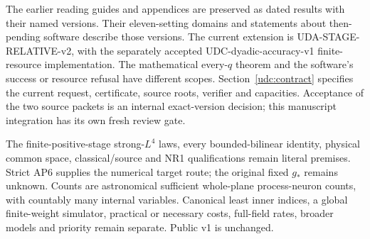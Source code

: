 The earlier reading guides and appendices are preserved as dated results
with their named versions. Their eleven-setting domains and statements
about then-pending software describe those versions. The current extension
is UDA-STAGE-RELATIVE-v2, with the separately accepted
UDC-dyadic-accuracy-v1 finite-resource implementation. The mathematical
every-$q$ theorem and the software's success or resource refusal have
different scopes. Section~\ref{udc:contract} specifies the current request,
certificate, source roots, verifier and capacities. Acceptance of the two
source packets is an internal exact-version decision; this manuscript
integration has its own fresh review gate.

The finite-positive-stage strong-$L^4$ laws, every bounded-bilinear identity,
physical common space, classical/source and NR1 qualifications remain
literal premises. Strict AP6 supplies the numerical target route; the
original fixed $g_*$ remains unknown. Counts are astronomical sufficient
whole-plane process-neuron counts, with countably many internal variables.
Canonical least inner indices, a global finite-weight simulator, practical
or necessary costs, full-field rates, broader models and priority remain
separate. Public v1 is unchanged.
\clearpage
